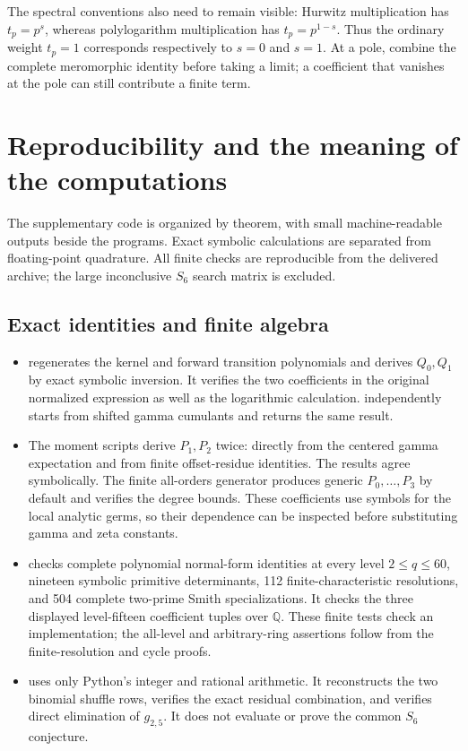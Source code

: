 The spectral conventions also need to remain visible: Hurwitz
multiplication has $t_p=p^s$, whereas polylogarithm multiplication
has $t_p=p^{1-s}$. Thus the ordinary weight $t_p=1$ corresponds
respectively to $s=0$ and $s=1$. At a pole, combine the complete
meromorphic identity before taking a limit; a coefficient that
vanishes at the pole can still contribute a finite term.

\section{Reproducibility and the meaning of the computations}
\label{cont:sec:verification}

The supplementary code is organized by theorem, with small
machine-readable outputs beside the programs. Exact symbolic
calculations are separated from floating-point quadrature.
All finite checks are reproducible from the delivered archive;
the large inconclusive $S_6$ search matrix is excluded.

\subsection{Exact identities and finite algebra}

\begin{itemize}[leftmargin=*]
\item {} regenerates the kernel
and forward transition polynomials and derives $Q_0,Q_1$ by
exact symbolic inversion. It verifies the two coefficients in the
original normalized expression as well as the logarithmic
calculation.  independently
starts from shifted gamma cumulants and returns the same result.

\item The moment scripts derive $P_1,P_2$ twice: directly from
the centered gamma expectation and from finite offset-residue
identities. The results agree symbolically. The finite all-orders
generator produces generic $P_0,\ldots,P_3$ by default and verifies
the degree bounds. These coefficients use symbols for the local
analytic germs, so their dependence can be inspected before
substituting gamma and zeta constants.

\item {}
checks complete polynomial normal-form identities at every level
$2\le q\le60$, nineteen symbolic primitive determinants,
112 finite-characteristic resolutions, and 504 complete two-prime
Smith specializations. It checks the three displayed level-fifteen
coefficient tuples over $\mathbb Q$. These finite tests check an
implementation; the all-level and arbitrary-ring assertions follow
from the finite-resolution and cycle proofs.

\item {} uses only
Python's integer and rational arithmetic. It reconstructs the two
binomial shuffle rows, verifies the exact residual combination,
and verifies direct elimination of $g_{2,5}$. It does not evaluate
or prove the common $S_6$ conjecture.
\end{itemize}

